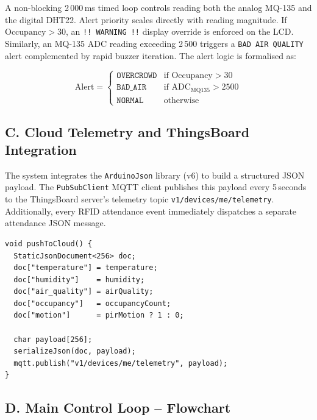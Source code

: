 \documentclass[12pt,a4paper]{article}
\begin{document}
A non-blocking 2\,000\,ms timed loop controls reading both the analog MQ-135 and the
digital DHT22. Alert priority scales directly with reading magnitude. If
$\text{Occupancy} > 30$, an \texttt{!! WARNING !!} display override is enforced on the LCD. 
Similarly, an MQ-135 ADC reading exceeding 2\,500 triggers a \texttt{BAD AIR QUALITY}
alert complemented by rapid buzzer iteration. The alert logic is formalised as:

\begin{equation}
\text{Alert} =
\begin{cases}
\texttt{OVERCROWD} & \text{if } \text{Occupancy} > 30 \\
\texttt{BAD\_AIR}  & \text{if } \text{ADC}_{\text{MQ135}} > 2500 \\
\texttt{NORMAL}    & \text{otherwise}
\end{cases}
\label{eq:alert}
\end{equation}

\subsection*{C. Cloud Telemetry and ThingsBoard Integration}

The system integrates the \texttt{ArduinoJson} library (v6) to build a structured JSON
payload. The \texttt{PubSubClient} MQTT client publishes this payload every 5\,seconds to
the ThingsBoard server's telemetry topic \texttt{v1/devices/me/telemetry}. Additionally,
every RFID attendance event immediately dispatches a separate attendance JSON message.

\begin{lstlisting}[caption={JSON telemetry payload construction (main.cpp)},
                   label=lst:cloud]
void pushToCloud() {
  StaticJsonDocument<256> doc;
  doc["temperature"] = temperature;
  doc["humidity"]    = humidity;
  doc["air_quality"] = airQuality;
  doc["occupancy"]   = occupancyCount;
  doc["motion"]      = pirMotion ? 1 : 0;

  char payload[256];
  serializeJson(doc, payload);
  mqtt.publish("v1/devices/me/telemetry", payload);
}
\end{lstlisting}

\subsection*{D. Main Control Loop -- Flowchart}
\end{document}
